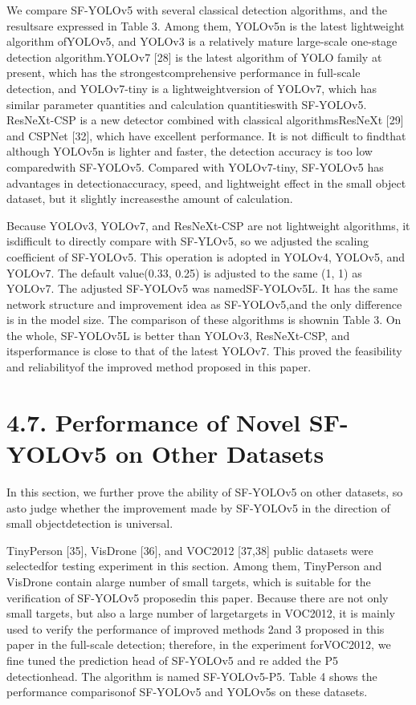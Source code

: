 \documentclass[
  10
]{article}
\begin{document}
We compare SF-YOLOv5 with several classical detection algorithms, and
the resultsare expressed in Table 3. Among them, YOLOv5n is the latest
lightweight algorithm ofYOLOv5, and YOLOv3 is a relatively mature
large-scale one-stage detection algorithm.YOLOv7 {[}28{]} is the latest
algorithm of YOLO family at present, which has the
strongestcomprehensive performance in full-scale detection, and
YOLOv7-tiny is a lightweightversion of YOLOv7, which has similar
parameter quantities and calculation quantitieswith SF-YOLOv5.
ResNeXt-CSP is a new detector combined with classical algorithmsResNeXt
{[}29{]} and CSPNet {[}32{]}, which have excellent performance. It is
not difficult to findthat although YOLOv5n is lighter and faster, the
detection accuracy is too low comparedwith SF-YOLOv5. Compared with
YOLOv7-tiny, SF-YOLOv5 has advantages in detectionaccuracy, speed, and
lightweight effect in the small object dataset, but it slightly
increasesthe amount of calculation.

Because YOLOv3, YOLOv7, and ResNeXt-CSP are not lightweight algorithms,
it isdifficult to directly compare with SF-YLOv5, so we adjusted the
scaling coefficient of SF-YOLOv5. This operation is adopted in YOLOv4,
YOLOv5, and YOLOv7. The default value(0.33, 0.25) is adjusted to the
same (1, 1) as YOLOv7. The adjusted SF-YOLOv5 was namedSF-YOLOv5L. It
has the same network structure and improvement idea as SF-YOLOv5,and the
only difference is in the model size. The comparison of these algorithms
is shownin Table 3. On the whole, SF-YOLOv5L is better than YOLOv3,
ResNeXt-CSP, and itsperformance is close to that of the latest YOLOv7.
This proved the feasibility and reliabilityof the improved method
proposed in this paper.

\section{4.7. Performance of Novel SF-YOLOv5 on Other
Datasets}\label{performance-of-novel-sf-yolov5-on-other-datasets}

In this section, we further prove the ability of SF-YOLOv5 on other
datasets, so asto judge whether the improvement made by SF-YOLOv5 in the
direction of small objectdetection is universal.

TinyPerson {[}35{]}, VisDrone {[}36{]}, and VOC2012 {[}37,38{]} public
datasets were selectedfor testing experiment in this section. Among
them, TinyPerson and VisDrone contain alarge number of small targets,
which is suitable for the verification of SF-YOLOv5 proposedin this
paper. Because there are not only small targets, but also a large number
of largetargets in VOC2012, it is mainly used to verify the performance
of improved methods 2and 3 proposed in this paper in the full-scale
detection; therefore, in the experiment forVOC2012, we fine tuned the
prediction head of SF-YOLOv5 and re added the P5 detectionhead. The
algorithm is named SF-YOLOv5-P5. Table 4 shows the performance
comparisonof SF-YOLOv5 and YOLOv5s on these datasets.
\end{document}
